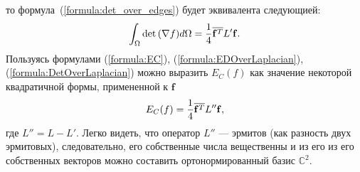 то формула~(\ref{formula:det_over_edges}) будет эквивалента следующией:
\begin{equation}
\label{formula:DetOverLaplacian}
  \int_{\Omega} \det {\left( \nabla f \right) } d\Omega = \frac{1}{4} \overline{\mathbf{f}^T} L' \mathbf{f}.
\end{equation}
Пользуясь формулами (\ref{formula:EC}), (\ref{formula:EDOverLaplacian}), 
(\ref{formula:DetOverLaplacian}) можно выразить $E_C(f)$ как значение некоторой квадратичной 
формы, примененной к $\mathbf{f}$
\begin{equation*}
  E_C(f) = \frac{1}{4}\overline{\mathbf{f}^T} L'' \mathbf{f},
\end{equation*}
где $L'' = L - L'$. Легко видеть, что оператор $L''$ --- эрмитов (как разность двух эрмитовых), 
следовательно, его собственные числа вещественны и из его из его собственных векторов можно составить ортонормированный базис 
$\mathbb{C}^2$.
